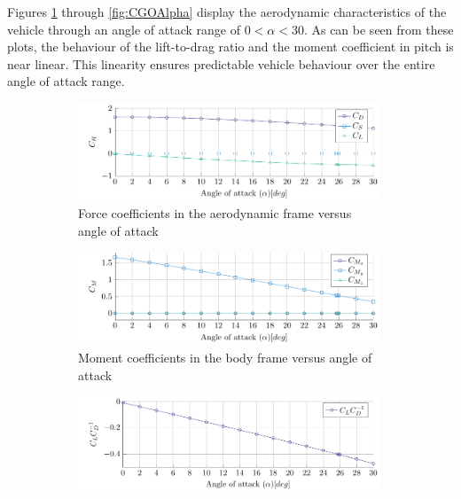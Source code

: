  Figures \ref{fig:CLCDCSAlpha} through \ref{fig:CGOAlpha} display the aerodynamic characteristics of the vehicle through an angle of attack range of $0<\alpha<30$. As can be seen from these plots, the behaviour of the lift-to-drag ratio and the moment coefficient in pitch is near linear. This linearity ensures predictable vehicle behaviour over the entire angle of attack range.
 
 \begin{figure}[h]
 	\centering
 	
 	\begin{subfigure}[b]{0.49\textwidth}
 		\includegraphics[width=0.99\textwidth]{./Figure/Aerodynamics/CDCSCLAlpha.pdf}
 		\caption{Force coefficients in the aerodynamic frame versus angle of attack}
 		\label{fig:CLCDCSAlpha}
 	\end{subfigure}
 	\begin{subfigure}[b]{0.49\textwidth}
 		\includegraphics[width=0.99\textwidth]{./Figure/Aerodynamics/CMXCMYCMZAlpha.pdf}
 		\caption{Moment coefficients in the body frame versus angle of attack}
 		\label{fig:CMxCMyCMzAlpha}
 	\end{subfigure}
 	\begin{subfigure}[b]{0.49\textwidth}
 		\includegraphics[width=0.99\textwidth]{./Figure/Aerodynamics/CLCDAlpha.pdf}

\end{subfigure}
\end{figure}
